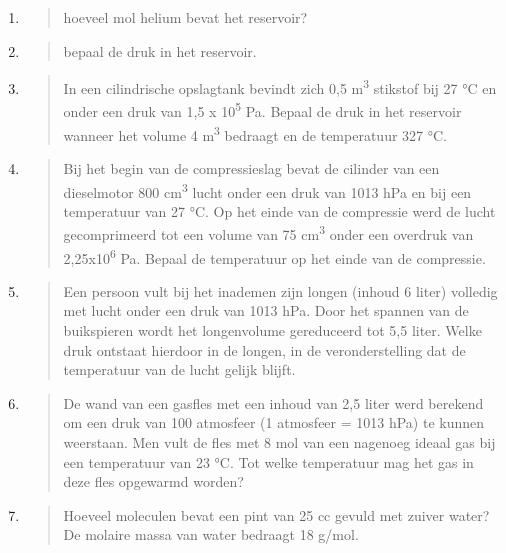 \documentclass[]{article}
\begin{document}
\begin{enumerate}
\begin{quote}
  \end{quote}
\item
  \begin{quote}
  hoeveel mol helium bevat het reservoir?
  \end{quote}
\item
  \begin{quote}
  bepaal de druk in het reservoir.
  \end{quote}
\item
  \begin{quote}
  In een cilindrische opslagtank bevindt zich 0,5 m\textsuperscript{3}
  stikstof bij 27 °C en onder een druk van 1,5 x 10\textsuperscript{5}
  Pa. Bepaal de druk in het reservoir wanneer het volume 4
  m\textsuperscript{3} bedraagt en de temperatuur 327 °C.
  \end{quote}
\item
  \begin{quote}
  Bij het begin van de compressieslag bevat de cilinder van een
  dieselmotor 800 cm\textsuperscript{3} lucht onder een druk van 1013
  hPa en bij een temperatuur van 27 °C. Op het einde van de compressie
  werd de lucht gecomprimeerd tot een volume van 75
  cm\textsuperscript{3} onder een overdruk van
  2,25x10\textsuperscript{6} Pa. Bepaal de temperatuur op het einde van
  de compressie.
  \end{quote}
\item
  \begin{quote}
  Een persoon vult bij het inademen zijn longen (inhoud 6 liter)
  volledig met lucht onder een druk van 1013 hPa. Door het spannen van
  de buikspieren wordt het longenvolume gereduceerd tot 5,5 liter. Welke
  druk ontstaat hierdoor in de longen, in de veronderstelling dat de
  temperatuur van de lucht gelijk blijft.
  \end{quote}
\item
  \begin{quote}
  De wand van een gasfles met een inhoud van 2,5 liter werd berekend om
  een druk van 100 atmosfeer (1 atmosfeer = 1013 hPa) te kunnen
  weerstaan. Men vult de fles met 8 mol van een nagenoeg ideaal gas bij
  een temperatuur van 23 °C. Tot welke temperatuur mag het gas in deze
  fles opgewarmd worden?
  \end{quote}
\item
  \begin{quote}
  Hoeveel moleculen bevat een pint van 25 cc gevuld met zuiver water? De
  molaire massa van water bedraagt 18 g/mol.
  \end{quote}

\end{enumerate}
\end{document}
